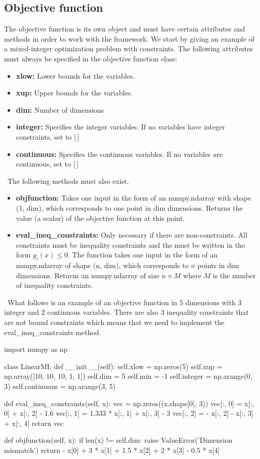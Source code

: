 \documentclass[]{article}
\begin{document}
\subsection{Objective function} 
\label{objfun}
The objective function is its own object and must have certain attributes and methods 
in order to work with the framework. We start by giving an example of a mixed-integer 
optimization problem with constraints. The following attributes must always be 
specified in the objective function class:
\begin{itemize}
\item \textbf{xlow:} Lower bounds for the variables.
\item \textbf{xup:} Upper bounds for the variables.
\item \textbf{dim:} Number of dimensions
\item \textbf{integer:} Specifies the integer variables. If no variables have 
integer constraints, set to [\,]
\item \textbf{continuous:} Specifies the continuous variables. If no variables 
are continuous, set to [\,]
\end{itemize}
\ \newline The following methods must also exist.
\begin{itemize}
\item \textbf{objfunction:} Takes one input in the form of an numpy.ndarray with 
shape (1, dim), which corresponds to one point in dim dimensions. Returns the 
value (a scalar) of the objective function at this point.
\item \textbf{eval\_ineq\_constraints:}  Only necessary if there are non-constraints. 
All constraints must be inequality constraints and the must be written in the form 
$g_i(x) \leq 0$. The function takes one input in the form of an numpy.ndarray of 
shape (n, dim), which corresponds to $n$ points in dim dimensions. Returns an 
numpy.ndarray of size $n \times M$ where $M$ is the number of inequality constraints.
\end{itemize}
\ \newline \noindent What follows is an example of an objective function in 5 dimensions 
with 3 integer and 2 continuous variables. There are also 3 inequality constraints that are 
not bound constraints which means that we need to implement the 
eval\_ineq\_constraints method.
\begin{python}
import numpy as np

class LinearMI:
    def __init__(self):
        self.xlow = np.zeros(5)
        self.xup = np.array([10, 10, 10, 1, 1])
        self.dim = 5
        self.min = -1
        self.integer = np.arange(0, 3)
        self.continuous = np.arange(3, 5)

    def eval_ineq_constraints(self, x):
        vec = np.zeros((x.shape[0], 3))
        vec[:, 0] = x[:, 0] + x[:, 2] - 1.6
        vec[:, 1] = 1.333 * x[:, 1] + x[:, 3] - 3
        vec[:, 2] = - x[:, 2] - x[:, 3] + x[:, 4]
        return vec

    def objfunction(self, x):
        if len(x) != self.dim:
            raise ValueError('Dimension mismatch')
        return - x[0] + 3 * x[1] + 1.5 * x[2] + 2 * x[3] - 0.5 * x[4]
\end{python}
\end{document}
